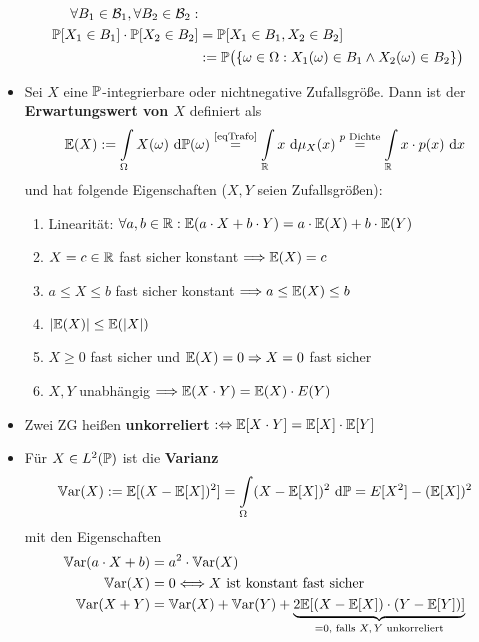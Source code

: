 \begin{itemize}
\begin{align*}
\forall B_1\in\B_1,\forall B_2\in\B_2:\\
\P[X_1\in B_1]\cdot \P[X_2\in B_2]
&=
\P[X_1\in B_1, X_2\in B_2]\\
&:=\P\big(\lbrace\omega\in\Omega:X_1(\omega)\in B_1\wedge X_2(\omega)\in B_2\rbrace\big)
\end{align*}
\item Sei $X$ eine $\P$-integrierbare oder nichtnegative Zufallsgröße. Dann ist der \textbf{Erwartungswert von $X$} definiert als
\begin{align*}
\E(X):=\int\limits_\Omega X(\omega)\d\P(\omega)
\stackeq{\text{\ref{eqTrafo}}}
\int\limits_\R x\d\mu_X (x)
\stackeq{p\text{ Dichte}}
\int\limits_\R x\cdot p(x)\d x
\end{align*}
und hat folgende Eigenschaften ($X,Y$ seien Zufallsgrößen):
\begin{enumerate}
\item Linearität: $\forall a,b\in\R:\E(a\cdot X+b\cdot Y)=a\cdot \E(X)+b\cdot\E(Y)$
\item $X=c\in\R$ fast sicher konstant $\Longrightarrow\E(X)=c$
\item $a\leq X\leq b$ fast sicher konstant $\Longrightarrow a\leq\E(X)\leq b$
\item $|\E(X)|\leq\E(|X|)$
\item $X\geq0$ fast sicher und $\E(X)=0\Rightarrow X=0$ fast sicher
\item $X,Y$ unabhängig $\Longrightarrow\E(X\cdot Y)=\E(X)\cdot E(Y)$
\end{enumerate}
\item Zwei ZG heißen \textbf{unkorreliert} $:\gdw\E[X\cdot Y]=\E[X]\cdot\E[Y]$
\item Für $X\in L^2(\P)$ ist die \textbf{Varianz} 
\begin{align*}
\Var(X):=\E[(X-\E[X])^2]=\int\limits_\Omega(X-\E[X])^2\d\P=E[X^2]-(\E[X])^2
\end{align*}
mit den Eigenschaften
\begin{align*}
\Var(a\cdot X+b)&=a^2\cdot\Var(X)\\
\Var(X)&=0\Longleftrightarrow X\text{ ist konstant fast sicher}\\
\Var(X+Y)&=\Var(X)+\Var(Y)+\underbrace{2\E[(X-\E[X])\cdot(Y-\E[Y])]}_{=0\text{, falls $X,Y$ unkorreliert}}
\end{align*}
\end{itemize}

